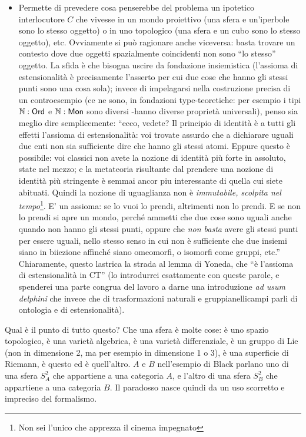 \documentclass{amsart}
\begin{document}
\begin{itemize}
	\item Permette di prevedere cosa penserebbe del problema un ipotetico interlocutore $C$ che vivesse in un mondo proiettivo (una sfera e un'iperbole sono lo stesso oggetto) o in uno topologico (una sfera e un cubo sono lo stesso oggetto), etc. Ovviamente si può ragionare anche viceversa: basta trovare un contesto dove due oggetti spazialmente coincidenti non sono ``lo stesso'' oggetto. La sfida è che bisogna uscire da fondazione insiemistica (l'assioma di estensionalità è precisamente l'asserto per cui due cose che hanno gli stessi punti sono una cosa sola); invece di impelagarsi nella costruzione precisa di un controesempio (ce ne sono, in fondazioni type-teoretiche: per esempio i tipi $\mathbb N : \sf Ord$ e $\mathbb N : \sf Mon$ sono diversi -hanno diverse proprietà universali), penso sia meglio dire semplicemente: ``ecco, vedete? Il principio di identità è  a tutti gli effetti l'assioma di estensionalità: voi trovate assurdo che a dichiarare uguali due enti non sia sufficiente dire che hanno gli stessi atomi. Eppure questo è possibile: voi classici non avete la nozione di identità più forte in assoluto, state nel mezzo; e la metateoria risultante dal prendere una nozione di identità più stringente è semmai ancor piu interessante di quella cui siete abituati. Quindi la nozione di uguaglianza non è \emph{immutabile, scolpita nel tempo}\footnote{Non sei l'unico che apprezza il cinema impegnato}. E' un assioma: se lo vuoi lo prendi, altrimenti non lo prendi. E se non lo prendi si apre un mondo, perché ammetti che due cose sono uguali anche quando non hanno gli stessi punti, oppure che \emph{non basta} avere gli stessi punti per essere uguali, nello stesso senso in cui non è sufficiente che due insiemi siano in biiezione affinché siano omeomorfi, o isomorfi come gruppi, etc.'' Chiaramente, questo lastrica la strada al lemma di Yoneda, che ``è l'assioma di estensionalità in CT'' (lo introdurrei esattamente con queste parole, e spenderei una parte congrua del lavoro a darne una introduzione \emph{ad usum delphini} che invece che di trasformazioni naturali e gruppianellicampi parli di ontologia e di estensionalità).
\end{itemize}
Qual è il punto di tutto questo? Che una sfera è molte cose: è uno spazio topologico, è una varietà algebrica, è una varietà differenziale, è un gruppo di Lie (non in dimensione 2, ma per esempio in dimensione 1 o 3), è una superficie di Riemann, è questo ed è quell'altro. $A$ e $B$ nell'esempio di Black parlano uno di una sfera $S^2_A$ che appartiene a una categoria $A$, e l'altro di una sfera $S^2_B$ che appartiene a una categoria $B$. Il paradosso nasce quindi da un uso scorretto e impreciso del formalismo.
\end{document}
